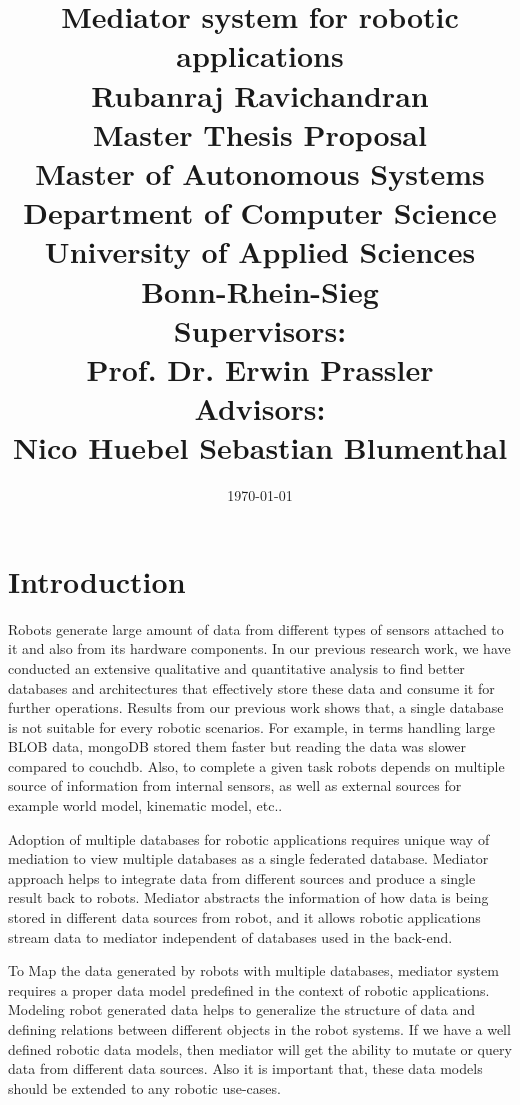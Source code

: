 \documentclass[12pt]{article}
\begin{document}
\title{\Large Mediator system for robotic applications\\
[6mm]
\Large Rubanraj Ravichandran\\
[12mm]
\Large Master Thesis Proposal\\
\small Master of Autonomous Systems\\
[12mm]
\Large Department of Computer Science\\
University of Applied Sciences Bonn-Rhein-Sieg\\
[12mm]
\Large Supervisors:\\
Prof. Dr. Erwin Prassler\\
\Large Advisors:\\
Nico Huebel
Sebastian Blumenthal
}
\date{\today}
\maketitle
\newpage
\section{Introduction}

Robots generate large amount of data from different types of sensors attached to it and also from its hardware components. In our previous research work, we have conducted an extensive qualitative and quantitative analysis to find better databases and architectures that effectively store these data and consume it for further operations. Results from our previous work shows that, a single database is not suitable for every robotic scenarios. For example, in terms handling large BLOB data, mongoDB stored them faster but reading the data was slower compared to couchdb. Also, to complete a given task robots depends on multiple source of information from internal sensors, as well as external sources for example world model, kinematic model, etc.. 

Adoption of multiple databases for robotic applications requires unique way of mediation to view multiple databases as a single federated database. Mediator approach helps to integrate data from different sources and produce a single result back to robots. Mediator abstracts the information of how data is being stored in different data sources from robot, and it allows robotic applications stream data to mediator independent of databases used in the back-end.

To Map the data generated by robots with multiple databases, mediator system requires a proper data model predefined in the context of robotic applications. Modeling robot generated data helps to generalize the structure of data and defining relations between different objects in the robot systems. If we have a well defined robotic data models, then mediator will get the ability to mutate or query data from different data sources. Also it is important that, these data models should be extended to any robotic use-cases.
\end{document}
